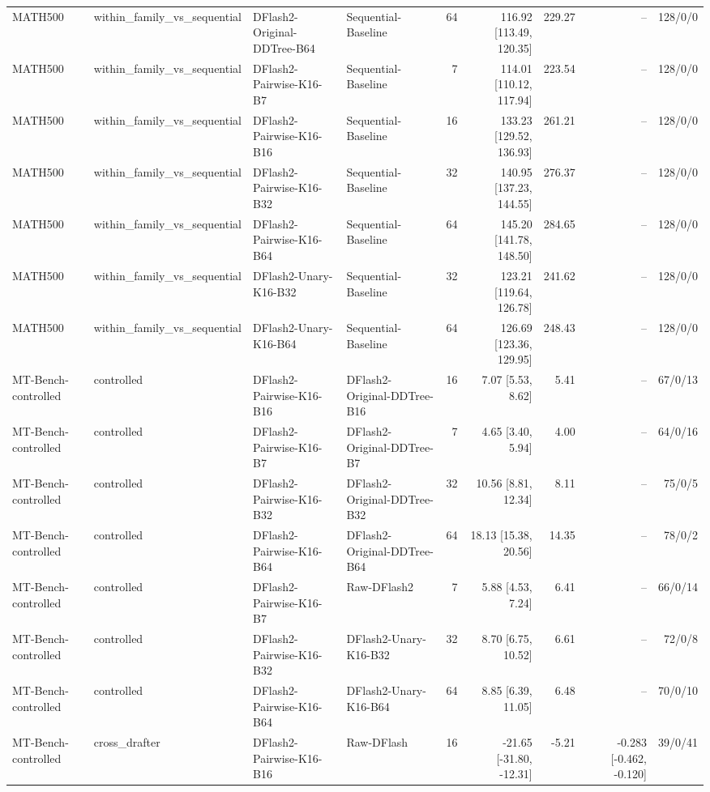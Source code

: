 \begin{longtable}{llllrrrrr}
MATH500 & within\_family\_vs\_sequential & DFlash2-Original-DDTree-B64 & Sequential-Baseline & 64 & 116.92 [113.49, 120.35] & 229.27 & -- & 128/0/0 \\
MATH500 & within\_family\_vs\_sequential & DFlash2-Pairwise-K16-B7 & Sequential-Baseline & 7 & 114.01 [110.12, 117.94] & 223.54 & -- & 128/0/0 \\
MATH500 & within\_family\_vs\_sequential & DFlash2-Pairwise-K16-B16 & Sequential-Baseline & 16 & 133.23 [129.52, 136.93] & 261.21 & -- & 128/0/0 \\
MATH500 & within\_family\_vs\_sequential & DFlash2-Pairwise-K16-B32 & Sequential-Baseline & 32 & 140.95 [137.23, 144.55] & 276.37 & -- & 128/0/0 \\
MATH500 & within\_family\_vs\_sequential & DFlash2-Pairwise-K16-B64 & Sequential-Baseline & 64 & 145.20 [141.78, 148.50] & 284.65 & -- & 128/0/0 \\
MATH500 & within\_family\_vs\_sequential & DFlash2-Unary-K16-B32 & Sequential-Baseline & 32 & 123.21 [119.64, 126.78] & 241.62 & -- & 128/0/0 \\
MATH500 & within\_family\_vs\_sequential & DFlash2-Unary-K16-B64 & Sequential-Baseline & 64 & 126.69 [123.36, 129.95] & 248.43 & -- & 128/0/0 \\
MT-Bench-controlled & controlled & DFlash2-Pairwise-K16-B16 & DFlash2-Original-DDTree-B16 & 16 & 7.07 [5.53, 8.62] & 5.41 & -- & 67/0/13 \\
MT-Bench-controlled & controlled & DFlash2-Pairwise-K16-B7 & DFlash2-Original-DDTree-B7 & 7 & 4.65 [3.40, 5.94] & 4.00 & -- & 64/0/16 \\
MT-Bench-controlled & controlled & DFlash2-Pairwise-K16-B32 & DFlash2-Original-DDTree-B32 & 32 & 10.56 [8.81, 12.34] & 8.11 & -- & 75/0/5 \\
MT-Bench-controlled & controlled & DFlash2-Pairwise-K16-B64 & DFlash2-Original-DDTree-B64 & 64 & 18.13 [15.38, 20.56] & 14.35 & -- & 78/0/2 \\
MT-Bench-controlled & controlled & DFlash2-Pairwise-K16-B7 & Raw-DFlash2 & 7 & 5.88 [4.53, 7.24] & 6.41 & -- & 66/0/14 \\
MT-Bench-controlled & controlled & DFlash2-Pairwise-K16-B32 & DFlash2-Unary-K16-B32 & 32 & 8.70 [6.75, 10.52] & 6.61 & -- & 72/0/8 \\
MT-Bench-controlled & controlled & DFlash2-Pairwise-K16-B64 & DFlash2-Unary-K16-B64 & 64 & 8.85 [6.39, 11.05] & 6.48 & -- & 70/0/10 \\
MT-Bench-controlled & cross\_drafter & DFlash2-Pairwise-K16-B16 & Raw-DFlash & 16 & -21.65 [-31.80, -12.31] & -5.21 & -0.283 [-0.462, -0.120] & 39/0/41 \\

\end{longtable}
